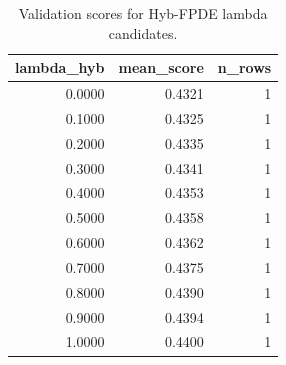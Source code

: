 \begin{table}[t]
\caption{Validation scores for Hyb-FPDE lambda candidates.}
\label{tab:lambda_distribution_computed}
\centering
\begin{tabular}{rrr}
\toprule
lambda\_hyb & mean\_score & n\_rows \\
\midrule
0.0000 & 0.4321 & 1 \\
0.1000 & 0.4325 & 1 \\
0.2000 & 0.4335 & 1 \\
0.3000 & 0.4341 & 1 \\
0.4000 & 0.4353 & 1 \\
0.5000 & 0.4358 & 1 \\
0.6000 & 0.4362 & 1 \\
0.7000 & 0.4375 & 1 \\
0.8000 & 0.4390 & 1 \\
0.9000 & 0.4394 & 1 \\
1.0000 & 0.4400 & 1 \\
\bottomrule
\end{tabular}

\end{table}

